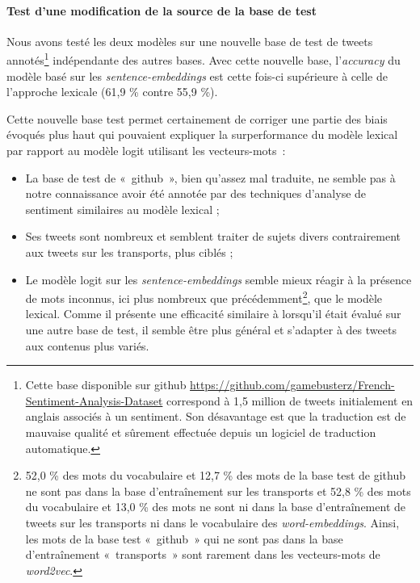 \documentclass[11pt,french,french]{article}
\let\rmarkdownfootnote\footnote%
\def\footnote{\protect\rmarkdownfootnote}
\begin{document}
\paragraph{Test d'une modification de la source de la base de
test}\label{subsec:basegit}

Nous avons testé les deux modèles sur une nouvelle base de test de
tweets annotés\footnote{Cette base disponible sur github
  \url{https://github.com/gamebusterz/French-Sentiment-Analysis-Dataset}
  correspond à 1,5 million de tweets initialement en anglais associés à
  un sentiment. Son désavantage est que la traduction est de mauvaise
  qualité et sûrement effectuée depuis un logiciel de traduction
  automatique.} indépendante des autres bases. Avec cette nouvelle base,
l'\emph{accuracy} du modèle basé sur les \emph{sentence-embeddings} est
cette fois-ci supérieure à celle de l'approche lexicale (61,9 \% contre
55,9 \%).

Cette nouvelle base test permet certainement de corriger une partie des
biais évoqués plus haut qui pouvaient expliquer la surperformance du
modèle lexical par rapport au modèle logit utilisant les vecteurs-mots~:

\begin{itemize}
\item
  La base de test de «~github~», bien qu'assez mal traduite, ne semble
  pas à notre connaissance avoir été annotée par des techniques
  d'analyse de sentiment similaires au modèle lexical ;
\item
  Ses tweets sont nombreux et semblent traiter de sujets divers
  contrairement aux tweets sur les transports, plus ciblés ;
\item
  Le modèle logit sur les \emph{sentence-embeddings} semble mieux réagir
  à la présence de mots inconnus, ici plus nombreux que
  précédemment\footnote{52,0 \% des mots du vocabulaire et 12,7 \% des
    mots de la base test de github ne sont pas dans la base
    d'entraînement sur les transports et 52,8 \% des mots du vocabulaire
    et 13,0 \% des mots ne sont ni dans la base d'entraînement de tweets
    sur les transports ni dans le vocabulaire des
    \emph{word-embeddings}. Ainsi, les mots de la base test «~github~»
    qui ne sont pas dans la base d'entraînement «~transports~» sont
    rarement dans les vecteurs-mots de \emph{word2vec}.}, que le modèle
  lexical. Comme il présente une efficacité similaire à lorsqu'il était
  évalué sur une autre base de test, il semble être plus général et
  s'adapter à des tweets aux contenus plus variés.
\end{itemize}
\end{document}
